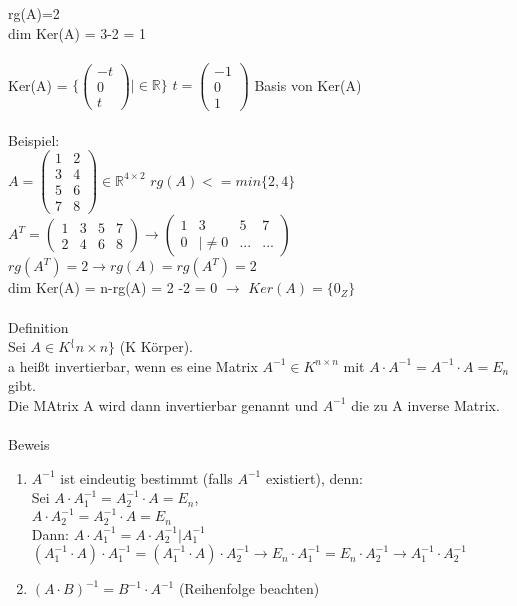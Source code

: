 \documentclass{scrartcl}
\begin{document}
	rg(A)=2 \\
	dim Ker(A) = 3-2 = 1\\\\
	Ker(A) = $\{ \begin{pmatrix}
		-t \\ 0 \\ t
	\end{pmatrix} \vert \in \mathbb{R} \}$ \hspace{2cm}	$t = \begin{pmatrix}
		-1 \\ 0 \\ 1
	\end{pmatrix}$ Basis von Ker(A)\\\\		
	Beispiel:\\
	$A = \begin{pmatrix}
		1 & 2 \\ 3 & 4 \\ 5 & 6 \\ 7 & 8
	\end{pmatrix} \in \mathbb{R}^{4 \times 2}$ \hspace{2cm} $rg(A) <= min\{ 2, 4 \}$\\
	$A^T = \begin{pmatrix}
		1 & 3 & 5 & 7 \\ 2 & 4 & 6 & 8
	\end{pmatrix} \rightarrow \begin{pmatrix}
		1 & 3 & 5 & 7 \\ 0 & \vert \not = 0 & ... & ...
	\end{pmatrix}$\\
	$rg(A^T) = 2 \rightarrow rg(A) = rg(A^T) = 2$\\
	dim Ker(A) = n-rg(A) = 2 -2 = 0 $\rightarrow$ $Ker(A) = \{0_Z\}$\\\\
	Definition\\
	Sei $A \in K ^\{ n \times n \}$ (K Körper).\\
	a heißt invertierbar, wenn es eine Matrix $A^{-1} \in K ^{n \times n}$ mit $A \cdot A^{-1} = A ^{-1} \cdot A = E_n$ gibt.\\
	Die MAtrix A wird dann invertierbar genannt und $A^{-1}$ die zu A inverse Matrix.\\\\
	Beweis\\
	\begin{enumerate}
		\item
		$A ^{-1}$ ist eindeutig bestimmt (falls $A^{-1}$ existiert), denn:\\
		Sei $A \cdot A^{-1}_1 = A^{-1}_2 \cdot A = E_n$, \\
		$A \cdot A^{-1}_2 = A^{-1}_2 \cdot A = E_n$\\
		Dann: $A \cdot A^{-1}_1 = A \cdot A^{-1}_2 \vert A^{-1}_1$\\
		$(A^{-1}_1 \cdot A) \cdot A ^{-1}_1 = (A^{-1}_1 \cdot A) \cdot A^{-1}_2 \rightarrow E_n \cdot A ^{-1}_1 = E_n \cdot A^{-1}_2 \rightarrow A^{-1}_1 \cdot A^{-1}_2$
		\item
		$(A \cdot B)^{-1} = B^{-1} \cdot A ^{-1}$ (Reihenfolge beachten)
	\end{enumerate}
\end{document}
